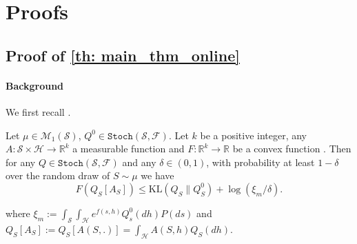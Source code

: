 \section{Proofs}
\label{sec: proofs-chap3}

\subsection{Proof of \cref{th: main_thm_online}}

\label{sec: proof_main_thm_online}




\paragraph{Background} We first recall \cite[Thm 2]{rivasplata2020pac}.

\begin{theorem}
\label{th: rivasplata2020}
Let $\mu \in \mathcal{M}_{1}(\mathcal{S})$, $Q^{0} \in \texttt{Stoch}(\mathcal{S},\mathcal{F})$. Let $k$ be a positive integer,  any  $A: \mathcal{S} \times \mathcal{H} \rightarrow \mathbb{R}^{k}$ a measurable function and $F: \mathbb{R}^{k} \rightarrow \mathbb{R}$ be a convex function .
Then for any $Q \in \texttt{Stoch}(\mathcal{S},\mathcal{F})$ and any $\delta \in(0,1)$, with probability at least $1-\delta$ over the random draw of $S \sim \mu$ we have
$$
F\left(Q_{S}\left[A_{S}\right]\right) \leq \mathrm{KL}\left(Q_{S} \| Q_{S}^{0}\right)+\log (\xi_m / \delta) .
$$

where $\xi_m:=\int_{\mathcal{S}} \int_{\mathcal{H}} e^{f(s, h)} Q_{s}^{0}(d h) P(d s)$ and $Q_S[A_S]:= Q_S[A(S,.)]= \int_{\mathcal{H}} A(S,h) Q_S(dh)$.
\end{theorem}


